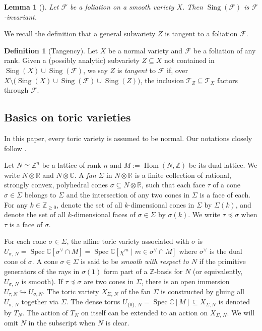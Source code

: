 \documentclass[12pt,reqno]{amsart}
\newtheorem{lemma}[theorem]{Lemma}
\theoremstyle{definition}
\newtheorem{definition}[theorem]{Definition}
\newcommand{\mb}{\mathbb}
\newcommand{\on}{\operatorname}
\newcommand\cF{{\mathcal{F}}}
\newcommand\cT{{\mathcal{T}}}
\newcommand\bC{{\mathbb C}}
\newcommand\bR{{\mathbb R}}
\newcommand\bZ{{\mathbb Z}}
\begin{document}
\begin{lemma}[{\cite[Lemma 3.5]{druel2021foliation}}]\label{sing_F_inv_lem}
    Let $\cF$ be a foliation on a smooth variety $X$. 
    Then $\on{Sing}(\cF)$ is $\cF$-invariant. 
\end{lemma}

We recall the definition that a general subvariety $Z$ is tangent to a foliation $\cF$. 
\begin{definition}[Tangency]\label{tangency}
Let $X$ be a normal variety and $\cF$ be a foliation of any rank.
Given a (possibly analytic) subvariety $Z\subseteq X$ not contained in $\on{Sing}(X)\cup\on{Sing}(\cF)$, we say $Z$ is \emph{tangent} to $\cF$ if, over $X\setminus\big(\on{Sing}(X)\cup\on{Sing}(\cF)\cup\on{Sing}(Z)\big)$, the inclusion $\cT_Z\subseteq\cT_X$ factors through $\cF$. 
\end{definition}

\subsection{Basics on toric varieties}
In this paper, every toric variety is assumed to be normal. Our notations closely follow \cite{CLS11}. 

Let $N\simeq \bZ^n$ be a lattice of rank $n$ and $M:=\on{Hom}(N,\mb Z)$ be its dual lattice. We write $N\otimes\mb R$ and $N\otimes\mb C$.
A \emph{fan} $\Sigma$ in $N\otimes\bR$ is a finite collection of rational, strongly convex, polyhedral cones $\sigma\subseteq N\otimes\bR$, such that each face $\tau$ of a cone $\sigma\in\Sigma$ belongs to $\Sigma$ and the intersection of any two cones in $\Sigma$ is a face of each. 
For any $k\in\bZ_{\geq 0}$, denote the set of all $k$-dimensional cones in $\Sigma$ by $\Sigma(k)$, and denote the set of all $k$-dimensional faces of $\sigma\in\Sigma$ by $\sigma(k)$.
We write $\tau\preceq\sigma$ when $\tau$ is a face of $\sigma$. 

For each cone $\sigma\in\Sigma$, the affine toric variety associated with $\sigma$ is  $U_{\sigma,\,N}=\on{Spec}\bC[\sigma^\vee\cap M]=\on{Spec}\bC[\chi^m\mid m\in\sigma^\vee\cap M]$ where $\sigma^\vee$ is the dual cone of $\sigma$. 
A cone $\sigma\in\Sigma$ is said to be \emph{smooth with respect to $N$} if the primitive generators of the rays in $\sigma(1)$ form part of a $\bZ$-basis for $N$ (or equivalently, $U_{\sigma,\,N}$ is smooth).
If $\tau\preceq \sigma$ are two cones in $\Sigma$, there is an open immersion $U_{\tau,N}\hookrightarrow U_{\sigma, N}$.
The toric variety $X_{\Sigma,\,N}$ of the fan $\Sigma$ is constructed by gluing all $U_{\sigma,\,N}$ together via $\Sigma$. 
The dense torus $U_{\{0\},\,N}=\on{Spec}\bC[M]\subseteq X_{\Sigma,N}$ is denoted by $T_N$. 
The action of $T_N$ on itself can be extended to an action on $X_{\Sigma,\,N}$. 
We will omit $N$ in the subscript when $N$ is clear. 
\end{document}
